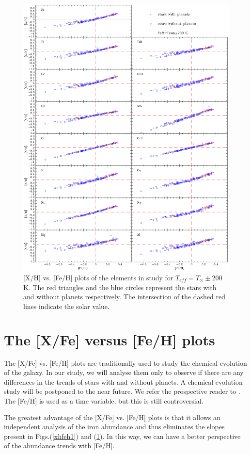 \documentclass[dvips,12pt,a4paper]{report}
\begin{document}
{{\begin{figure}[h]
\centering
\includegraphics[width=16 cm, height=15 cm]{pics/parte4/xhfehfinal/xhfehtsolfinal.eps}
\caption[abundance gfx for solar temperatures]{[X/H] vs. [Fe/H] plots of the elements in study for $T_{eff}=T_\odot\pm$200 K. The red triangles and the blue circles represent the stars with and without planets respectively. The intersection of the dashed red lines indicate the solar value.}
\label{xhfeh2}
\end{figure}

\section {The [X/Fe] versus [Fe/H] plots}
\label{xfefeh}
The [X/Fe] vs. [Fe/H] plots are traditionally used to study the chemical evolution of the galaxy. In our study, we will analyse them only to observe if there are any differences in the trends of stars with and without planets. A chemical evolution study will be postponed to the near future. We refer the prospective reader to \citet{McWilliam-1997}. The [Fe/H] is used as a time variable, but this is still controversial.

The greatest advantage of the [X/Fe] vs. [Fe/H] plots is that it allows an independent analysis of the iron abundance and thus eliminates the slopes present in Figs.(\ref{xhfeh1}) and (\ref{xhfeh2}). In this way, we can have a better perspective of the abundance trends with [Fe/H]. 

}}
\end{document}
